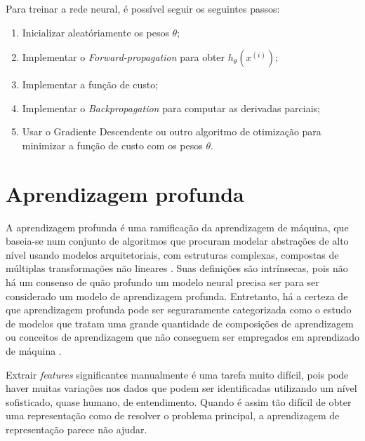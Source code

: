 Para treinar a rede neural, é possível seguir os seguintes passos:

\begin{enumerate}

\item Inicializar aleatóriamente os pesos $\theta$;
\item Implementar o \textit{Forward-propagation} para obter $h_\theta(x^{(i)})$;
\item Implementar a função de custo;
\item Implementar o \textit{Backpropagation} para computar as derivadas parciais;
\item Usar o Gradiente Descendente ou outro algoritmo de otimização para minimizar a função de custo com os pesos $\theta$.

\end{enumerate}


\section{Aprendizagem profunda}

A aprendizagem profunda é uma ramificação da aprendizagem de máquina, que baseia-se num conjunto de algoritmos que procuram modelar abstrações de alto nível usando modelos arquitetoriais, com estruturas complexas, compostas de múltiplas transformações não lineares \cite{deng2014deep}. Suas definições são intrínsecas, pois não há um consenso de quão profundo um modelo neural precisa ser para ser considerado um modelo de aprendizagem profunda. Entretanto, há a certeza de que aprendizagem profunda pode ser seguraramente categorizada como o estudo de modelos que tratam uma grande quantidade de composições de aprendizagem ou conceitos de aprendizagem que não conseguem ser empregados em aprendizado de máquina \cite{bengio2015deep}. 




Extrair \textit{features} significantes manualmente é uma tarefa muito difícil, pois pode haver muitas variações nos dados que podem ser identificadas utilizando um nível sofisticado, quase humano, de entendimento. Quando é assim tão difícil de obter uma representação como de resolver o problema principal, a aprendizagem de representação parece não ajudar. 

